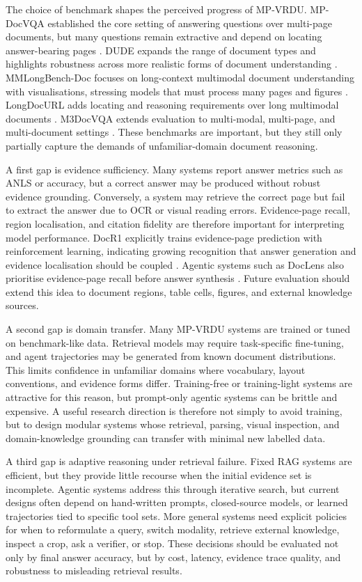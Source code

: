 \documentclass[10pt,a4paper]{article}
\begin{document}
The choice of benchmark shapes the perceived progress of MP-VRDU. MP-DocVQA established the core setting of answering questions over multi-page documents, but many questions remain extractive and depend on locating answer-bearing pages \cite{tito2023hierarchical}. DUDE expands the range of document types and highlights robustness across more realistic forms of document understanding \cite{van2023document}. MMLongBench-Doc focuses on long-context multimodal document understanding with visualisations, stressing models that must process many pages and figures \cite{ma2024mmlongbench}. LongDocURL adds locating and reasoning requirements over long multimodal documents \cite{deng2025longdocurl}. M3DocVQA extends evaluation to multi-modal, multi-page, and multi-document settings \cite{cho2025m3docvqa}. These benchmarks are important, but they still only partially capture the demands of unfamiliar-domain document reasoning.

A first gap is evidence sufficiency. Many systems report answer metrics such as ANLS or accuracy, but a correct answer may be produced without robust evidence grounding. Conversely, a system may retrieve the correct page but fail to extract the answer due to OCR or visual reading errors. Evidence-page recall, region localisation, and citation fidelity are therefore important for interpreting model performance. DocR1 explicitly trains evidence-page prediction with reinforcement learning, indicating growing recognition that answer generation and evidence localisation should be coupled \cite{xiong2026docr1}. Agentic systems such as DocLens also prioritise evidence-page recall before answer synthesis \cite{zhu2025doclens}. Future evaluation should extend this idea to document regions, table cells, figures, and external knowledge sources.

A second gap is domain transfer. Many MP-VRDU systems are trained or tuned on benchmark-like data. Retrieval models may require task-specific fine-tuning, and agent trajectories may be generated from known document distributions. This limits confidence in unfamiliar domains where vocabulary, layout conventions, and evidence forms differ. Training-free or training-light systems are attractive for this reason, but prompt-only agentic systems can be brittle and expensive. A useful research direction is therefore not simply to avoid training, but to design modular systems whose retrieval, parsing, visual inspection, and domain-knowledge grounding can transfer with minimal new labelled data.

A third gap is adaptive reasoning under retrieval failure. Fixed RAG systems are efficient, but they provide little recourse when the initial evidence set is incomplete. Agentic systems address this through iterative search, but current designs often depend on hand-written prompts, closed-source models, or learned trajectories tied to specific tool sets. More general systems need explicit policies for when to reformulate a query, switch modality, retrieve external knowledge, inspect a crop, ask a verifier, or stop. These decisions should be evaluated not only by final answer accuracy, but by cost, latency, evidence trace quality, and robustness to misleading retrieval results.
\end{document}
